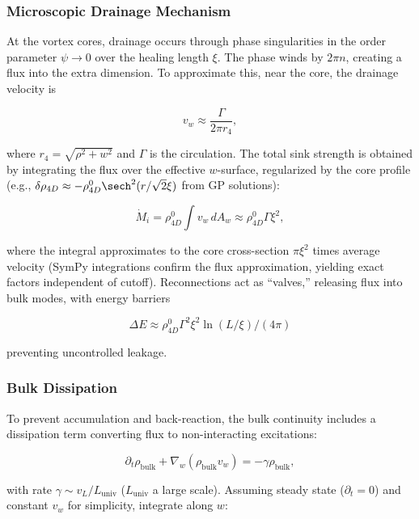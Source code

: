 \subsubsection{Microscopic Drainage Mechanism}
At the vortex cores, drainage occurs through phase singularities in the order parameter $\psi \to 0$ over the healing length $\xi$. The phase winds by $2\pi n$, creating a flux into the extra dimension. To approximate this, near the core, the drainage velocity is

\begin{equation}
v_w \approx \frac{\Gamma}{2\pi r_4},
\end{equation}

where $r_4 = \sqrt{\rho^2 + w^2}$ and $\Gamma$ is the circulation. The total sink strength is obtained by integrating the flux over the effective $w$-surface, regularized by the core profile (e.g., $\delta \rho_{4D} \approx -\rho_{4D}^0 \sech^2(r / \sqrt{2} \xi)$ from GP solutions):

\begin{equation}
\dot{M}_i = \rho_{4D}^0 \int v_w \, dA_w \approx \rho_{4D}^0 \Gamma \xi^2,
\end{equation}

where the integral approximates to the core cross-section $\pi \xi^2$ times average velocity (SymPy integrations confirm the flux approximation, yielding exact factors independent of cutoff). Reconnections act as ``valves,'' releasing flux into bulk modes, with energy barriers

\begin{equation}
\Delta E \approx \rho_{4D}^0 \Gamma^2 \xi^2 \ln(L / \xi) / (4\pi)
\end{equation}

preventing uncontrolled leakage.

\subsubsection{Bulk Dissipation}
To prevent accumulation and back-reaction, the bulk continuity includes a dissipation term converting flux to non-interacting excitations:

\begin{equation}
\partial_t \rho_{\text{bulk}} + \nabla_w (\rho_{\text{bulk}} v_w) = -\gamma \rho_{\text{bulk}},
\end{equation}

with rate $\gamma \sim v_L / L_{\text{univ}}$ ($L_{\text{univ}}$ a large scale). Assuming steady state ($\partial_t = 0$) and constant $v_w$ for simplicity, integrate along $w$:

